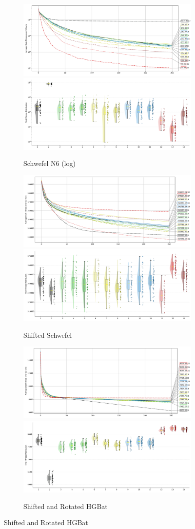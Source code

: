 \begin{figure}[p]
\begin{subfigure}{1\textwidth}
    \centering
    \includegraphics[width=.49\textwidth]{Figures/results/1000/Schwefel_N6_All_selected_algorithms_dim1000_annot_legend.png}
    \includegraphics[width=.49\textwidth]{Figures/results/1000/Schwefel_N6_all_dim1000_raincloud_vertical.png}
    \caption{Schwefel N6 (log)}
\end{subfigure}

\begin{subfigure}{1\textwidth}
    \centering
    \includegraphics[width=.49\textwidth]{Figures/results/1000/Shifted_Schwefel_All_selected_algorithms_dim1000_annot_legend.png}
    \includegraphics[width=.49\textwidth]{Figures/results/1000/Shifted_Schwefel_all_dim1000_raincloud_vertical.png}
    \caption{Shifted Schwefel}
\end{subfigure}

\begin{subfigure}{1\textwidth}
    \centering
    \includegraphics[width=.49\textwidth]{Figures/results/1000/Shifted_and_Rotated_HGBat_All_selected_algorithms_dim1000_annot_legend.png}
    \includegraphics[width=.49\textwidth]{Figures/results/1000/Shifted_and_Rotated_HGBat_all_dim1000_raincloud_vertical.png}
    \caption{Shifted and Rotated HGBat}
\end{subfigure}


\end{figure}
